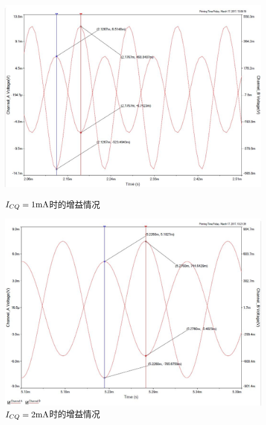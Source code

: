 \documentclass[UTF8,a4paper]{ctexart}
\begin{document}
\begin{figure}
\centering
\includegraphics[width=\textwidth]{A1.JPG}
\caption{$I_{CQ}=1\rm{mA}$时的增益情况}
\label{A1}
\includegraphics[width=\textwidth]{A2.JPG}
\caption{$I_{CQ}=2\rm{mA}$时的增益情况}
\label{A2}
\end{figure}
\end{document}
